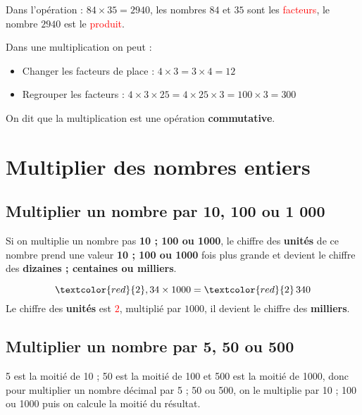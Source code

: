 \begin{pageCours}
\begin{Ex}
Dans l'opération : $84\times35=2940$, les nombres $84$ et $35$ sont les \textcolor{red}{facteurs}, le nombre $2940$ est le \textcolor{red}{produit}.
\end{Ex}

\begin{Pp}
Dans une multiplication on peut :
\begin{itemize}
    \item Changer les facteurs de place : $4\times3=3\times4=12$
    \item Regrouper les facteurs : $4\times3\times25=4\times25\times3=100\times3=300$
\end{itemize}
On dit que la multiplication est une opération \textbf{commutative}.
\end{Pp}

\section{Multiplier des nombres entiers}

\subsection{Multiplier un nombre par 10, 100 ou 1 000}

\begin{Mt}
Si on multiplie un nombre pas \textbf{10 ; 100 ou 1000}, le chiffre des \textbf{unités} de ce nombre prend une valeur \textbf{10 ; 100 ou 1000} fois plus grande et devient le chiffre des \textbf{dizaines ; centaines ou milliers}.
\end{Mt}

\begin{Ex}
\[\textcolor{red}{2},34\times1000=\textcolor{red}{2}\,340\]
Le chiffre des \textbf{unités} est \textcolor{red}{$2$}, multiplié par $1000$, il devient le chiffre des \textbf{milliers}.
\end{Ex} 

\subsection{Multiplier un nombre par 5, 50 ou 500}

\begin{Mt}
5 est la moitié de 10 ; 50 est la moitié de 100 et 500 est la moitié de 1000, donc pour multiplier un nombre décimal par 5 ; 50 ou 500, on le multiplie par 10 ; 100 ou 1000 puis on calcule la moitié du résultat.\\
\end{Mt}


\end{pageCours}
